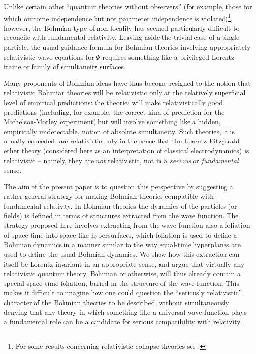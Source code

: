 \documentclass[12pt]{article}
\begin{document}
Unlike certain
other ``quantum theories without observers'' (for example, those for which outcome independence but not parameter independence is violated)\footnote{For some results concerning relativistic collapse theories see \cite{tumulka06a,bedingham11}.},
however, the Bohmian type of non-locality has seemed particularly
difficult to reconcile with fundamental relativity.  Leaving aside the
trivial case of a single particle, the usual guidance formula for Bohmian
theories involving appropriately relativistic wave equations for
$\Psi$ requires something like a privileged Lorentz frame or family of simultaneity surfaces. 

Many proponents of Bohmian ideas have thus become resigned to the 
notion that relativistic Bohmian theories will be relativistic only at
the relatively superficial level of empirical predictions:  the
theories will make relativistically good predictions (including, for
example, the correct kind of prediction for the Michelson-Morley
experiment) but will involve something like a hidden, empirically 
undetectable, notion of absolute simultaneity.  Such theories,
it is usually conceded, are relativistic only in the sense that the
Lorentz-Fitzgerald ether theory (considered here as an interpretation
of classical electrodynamics) is relativistic -- namely, they are
\emph{not} relativistic, not in a \emph{serious} or \emph{fundamental}
sense.  

The aim of the present paper is to question this perspective by
suggesting a rather general strategy for making Bohmian theories
compatible with fundamental relativity. In Bohmian theories the
dynamics of the particles (or fields) is defined in terms of
structures extracted from the wave function. The strategy proposed
here involves extracting from the wave function also a foliation of
space-time into space-like hypersurfaces, which foliation is used to define a Bohmian dynamics in a manner similar to the way equal-time hyperplanes are used to define the usual Bohmian dynamics. We show
how this extraction can itself be Lorentz invariant in an appropriate
sense, and argue that virtually any relativistic quantum
theory, Bohmian or otherwise, will thus already contain a special
space-time foliation, buried in the structure of the wave function.
This makes it difficult to imagine how one could question the
``seriously relativistic'' character of the Bohmian theories to be
described, without simultaneously denying that any theory in which
something like a universal wave function plays a fundamental role can be a
candidate for serious compatibility with relativity.
\end{document}
